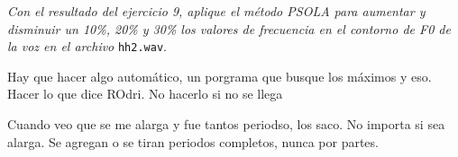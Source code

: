


\emph{Con el resultado del ejercicio 9, aplique el método PSOLA para aumentar y disminuir un 10\%,
20\% y 30\% los valores de frecuencia en el contorno de F0 de la voz en el archivo} \texttt{hh2.wav}.



Hay que hacer algo automático, un porgrama que busque los máximos y eso. Hacer lo que dice ROdri.
No hacerlo si no se llega



Cuando veo que se me alarga y fue tantos periodso, los saco. No importa si sea alarga. Se agregan o se tiran periodos completos, nunca por partes.
